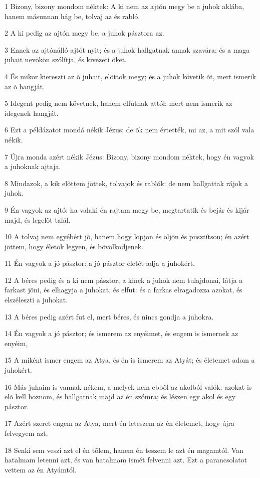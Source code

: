 \par 1 Bizony, bizony mondom néktek: A ki nem az ajtón megy be a juhok aklába, hanem másunnan hág be, tolvaj az és rabló.
\par 2 A ki pedig az ajtón megy be, a juhok pásztora az.
\par 3 Ennek az ajtónálló ajtót nyit; és a juhok hallgatnak annak szavára; és a maga juhait nevökön szólítja, és kivezeti õket.
\par 4 És mikor kiereszti az õ juhait, elõttök megy; és a juhok követik õt, mert ismerik az õ hangját.
\par 5 Idegent pedig nem követnek, hanem elfutnak attól: mert nem ismerik az idegenek hangját.
\par 6 Ezt a példázatot mondá nékik Jézus; de õk nem értették, mi az, a mit szól vala nékik.
\par 7 Újra monda azért nékik Jézus: Bizony, bizony mondom néktek, hogy én vagyok a juhoknak ajtaja.
\par 8 Mindazok, a kik elõttem jöttek, tolvajok és rablók: de nem hallgattak rájok a juhok.
\par 9 Én vagyok az ajtó: ha valaki én rajtam megy be, megtartatik és bejár és kijár majd, és legelõt talál.
\par 10 A tolvaj nem egyébért jõ, hanem hogy lopjon és öljön és pusztítson; én azért jöttem, hogy életök legyen, és bõvölködjenek.
\par 11 Én vagyok a jó pásztor: a jó pásztor  életét adja a juhokért.
\par 12 A béres pedig és a ki nem pásztor, a kinek a juhok nem tulajdonai, látja a farkast jõni, és elhagyja a juhokat, és elfut: és a farkas elragadozza azokat, és elszéleszti a juhokat.
\par 13 A béres pedig azért fut el, mert béres, és nincs gondja a juhokra.
\par 14 Én vagyok a jó pásztor; és ismerem az enyéimet, és engem is ismernek az enyéim,
\par 15 A miként ismer engem az Atya, és én is ismerem az Atyát; és életemet adom a juhokért.
\par 16 Más juhaim is vannak nékem, a melyek nem ebbõl az akolból valók: azokat is elõ kell hoznom, és hallgatnak majd az én szómra; és lészen egy akol és egy pásztor.
\par 17 Azért szeret engem az Atya, mert én leteszem az én életemet, hogy újra felvegyem azt.
\par 18 Senki sem veszi azt el én tõlem, hanem én teszem le azt én magamtól. Van hatalmam letenni azt, és van hatalmam ismét felvenni azt. Ezt a parancsolatot vettem az én Atyámtól.
